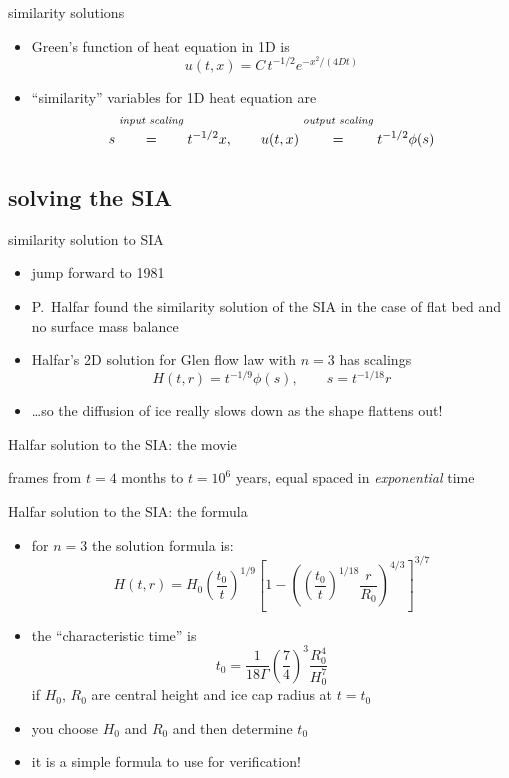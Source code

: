 \documentclass[titlepage,letterpaper,final,12pt]{scrartcl}
\begin{document}
similarity solutions

\begin{itemize}
\item Green's function of heat equation in 1D is
	$$u(t,x) = C\, t^{-1/2} e^{-x^2/(4Dt)}$$
\item ``similarity'' variables for 1D heat equation are
	$$s \stackrel{\text{\emph{input scaling}}}{\phantom{\Big|}=\phantom{\Big|}} t^{-1/2} x, \qquad u(t,x) \stackrel{\text{\emph{output scaling}}}{\phantom{\Big|}=\phantom{\Big|}} t^{-1/2} \phi(s)$$
\end{itemize}




\subsection{solving the SIA}

similarity solution to SIA

\begin{itemize}
\item jump forward to 1981
\item P.~Halfar found the similarity solution of the SIA in the case of flat bed and no surface mass balance \nocite{Halfar81,Halfar83}
\item Halfar's 2D solution for Glen flow law with $n=3$ has scalings
   $$H(t,r)=t^{-1/9} \phi(s), \qquad s = t^{-1/18} r$$
\item \dots so the diffusion of ice really slows down as the shape flattens out!
\end{itemize}

Halfar solution to the SIA: the movie


frames from $t=4$ months to $t = 10^6$ years, equal spaced in \emph{exponential} time

Halfar solution to the SIA: the formula

\begin{itemize}
\item for $n=3$ the solution formula is:
  $$H(t,r) = H_0 \left(\frac{t_0}{t}\right)^{1/9} \left[1 - \left(\left(\frac{t_0}{t}\right)^{1/18} \frac{r}{R_0}\right)^{4/3}\right]^{3/7}$$
\item the ``characteristic time'' is
  $$t_0 = \frac{1}{18 \Gamma} \left(\frac{7}{4}\right)^3 \frac{R_0^4}{H_0^{7}}$$
if $H_0$, $R_0$ are central height and ice cap radius at $t=t_0$
\item you choose $H_0$ and $R_0$ and then determine $t_0$
\item it is a simple formula to use for verification!
\end{itemize}
\end{document}
